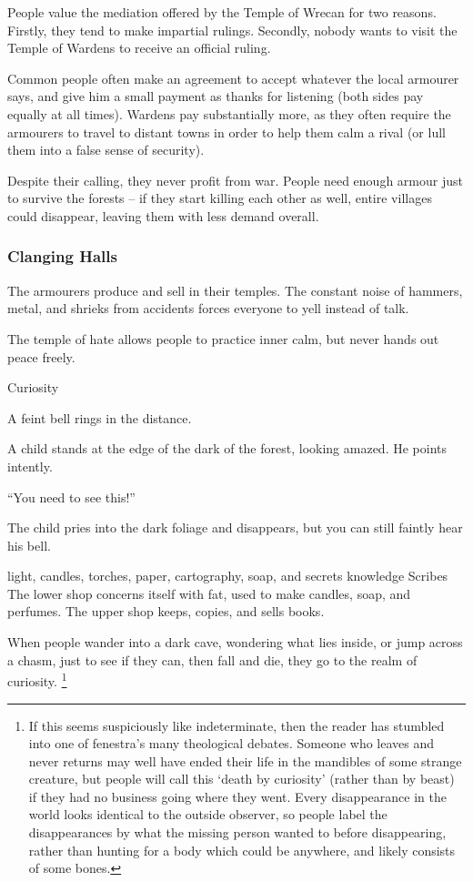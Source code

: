 \begin{multicols}{2}
\noindent
People value the mediation offered by the Temple of Wrecan for two reasons.
Firstly, they tend to make impartial rulings.
Secondly, nobody wants to visit the Temple of Wardens to receive an official ruling.

Common people often make an agreement to accept whatever the local armourer says, and give him a small payment as thanks for listening (both sides pay equally at all times).
Wardens pay substantially more, as they often require the armourers to travel to distant towns in order to help them calm a rival (or lull them into a false sense of security).

Despite their calling, they never profit from war.
People need enough armour just to survive the forests -- if they start killing each other as well, entire villages could disappear, leaving them with less demand overall.

\subsubsection{Clanging Halls}
The armourers produce and sell in their temples.
The constant noise of hammers, metal, and shrieks from accidents forces everyone to yell instead of talk.

The temple of hate allows people to practice inner calm, but never hands out peace freely.

  {\bell}%
  {Curiosity}%
  {
    A feint bell rings in the distance.

    A child stands at the edge of the dark of the forest, looking amazed.
    He points intently.

    ``You need to see this!''

    The child pries into the dark foliage and disappears, but you can still faintly hear his bell.
  }%
  {light, candles, torches, paper, cartography, soap, and secrets}%
  {knowledge}%
  {Scribes}%
  {
    The lower shop concerns itself with fat, used to make candles, soap, and perfumes.
    The upper shop keeps, copies, and sells books.
  }%

When people wander into a dark cave, wondering what lies inside, or jump across a chasm, just to see if they can, then fall and die, they go to the realm of curiosity.
\ignorespaces\footnote{If this seems suspiciously like indeterminate, then the reader has stumbled into one of \gls{fenestra}'s many theological debates.
Someone who leaves and never returns may well have ended their life in the mandibles of some strange creature, but people will call this `death by curiosity' (rather than by beast) if they had no business going where they went.
Every disappearance in the world looks identical to the outside observer, so people label the disappearances by what the missing person wanted to before disappearing, rather than hunting for a body which could be anywhere, and likely consists of some bones.

}
\end{multicols}
